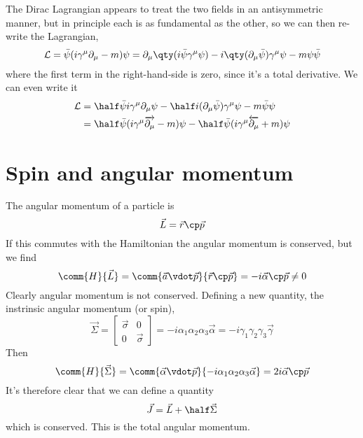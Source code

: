 The Dirac Lagrangian appears to treat the two fields in an
antisymmetric manner, but in principle each is as fundamental as the
other, so we can then re-write the Lagrangian, 
\[ \Lag = \bar{\psi}(i \gamma^{\mu} \pd{\mu}-m) \psi = \pd{\mu} \qty(
i \bar{\psi} \gamma^{\mu} \psi) - i \qty( \pd{\mu} \bar{\psi} )
\gamma^{\mu} \psi - m \psi \bar{\psi} \] where the first term in the
right-hand-side is zero, since it's a total derivative.
We can even write it
\begin{align*}
  \Lag &= \half \bar{\psi} i \gamma^{\mu} \pd{\mu}\psi - \half i (\pd{\mu}\bar{\psi}) \gamma^{\mu} \psi - m \bar{\psi} \psi \\ 
&= \half \bar{\psi} (i \gamma^{\mu} \rpd{\mu} - m) \psi - \half \bar{\psi} ( i \gamma^{\mu} \lpd{\mu} + m)\psi
\end{align*}

\section{Spin and angular momentum}
\label{sec:spin-angul-moment}

The angular momentum of a particle is 
\[ \vec{L} = \vec{r} \cp \vec{p} \] If this commutes with the
Hamiltonian the angular momentum is conserved, but we find
\begin{equation}
  \label{eq:92}
  \comm{H}{\vec{L}} = \comm{\vec{a}\vdot \vec{p}}{\vec{r} \cp \vec{p}} = - i \vec{\alpha} \cp \vec{p} \neq 0
\end{equation}
Clearly angular momentum is not conserved. Defining a new quantity, the instrinsic angular momentum (or spin),
\begin{equation}
  \label{eq:93}
  \vec{\Sigma} =
  \begin{bmatrix}
    \vec{\sigma} & 0 \\ 0 & \vec{\sigma}
  \end{bmatrix}
  = -i \alpha_1 \alpha_2 \alpha_3 \vec{\alpha}
= - i \gamma_1\gamma_2\gamma_3 \vec{\gamma}
\end{equation}
Then
\begin{equation}
  \label{eq:94}
  \comm{H}{\vec{\Sigma}} = \comm{\vec{\alpha} \vdot \vec{p}}{-i \alpha_1 \alpha_2 \alpha_3 \vec{\alpha}} = 2 i \vec{\alpha} \cp \vec{p}
\end{equation}
It's therefore clear that we can define a quantity
\begin{equation}
  \label{eq:95}
  \vec{J} = \vec{L} + \half \vec{\Sigma}
\end{equation}
which is conserved. This is the total angular momentum.

